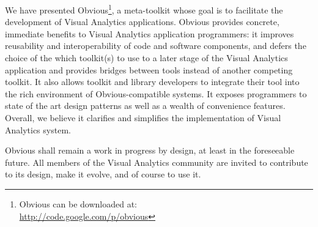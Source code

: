 
We have presented Obvious\footnote{Obvious can be downloaded at:\\
  \url{http://code.google.com/p/obvious}}, a meta-toolkit whose goal
is to facilitate the development of Visual Analytics applications.
Obvious provides concrete, immediate benefits to Visual Analytics
application programmers: it improves reusability and interoperability
of code and software components, and defers the choice of the which
toolkit(s) to use to a later stage of the Visual Analytics application
and provides bridges between tools instead of another competing
toolkit.  It also allows toolkit and library developers to integrate
their tool into the rich environment of Obvious-compatible systems.
It exposes programmers to state of the art design patterns as well as
a wealth of convenience features.  Overall, we believe it clarifies
and simplifies the implementation of Visual Analytics system.

Obvious shall remain a work in progress by design, at least in the
foreseeable future.  All members of the Visual Analytics community are
invited to contribute to its design, make it evolve, and of course to
use it.  
